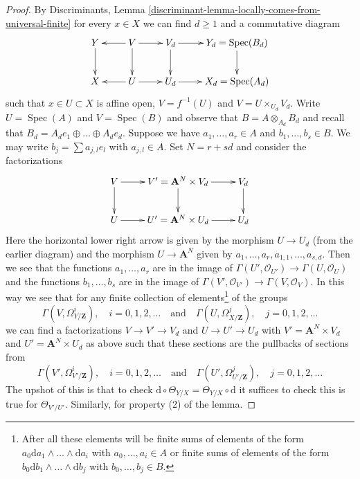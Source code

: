 \documentclass[10pt,a4paper]{amsart}
\theoremstyle{plain}
\theoremstyle{definition}
\theoremstyle{remark}
\numberwithin{equation}{subsection}
\def\Spec{\mathop{\mathrm{Spec}}}
\begin{document}
\begin{proof}
By Discriminants, Lemma
\ref{discriminant-lemma-locally-comes-from-universal-finite}
for every $x \in X$ we can find $d \geq 1$ and a commutative diagram
$$
\xymatrix{
Y \ar[d] &
V \ar[d] \ar[l] \ar[r] &
V_d \ar[d] \ar[r] &
Y_d = \Spec(B_d) \ar[d] \\
X &
U \ar[l] \ar[r] &
U_d \ar[r] &
X_d = \Spec(A_d)
}
$$
such that $x \in U \subset X$ is affine open, $V = f^{-1}(U)$
and $V = U \times_{U_d} V_d$. Write $U = \Spec(A)$ and $V = \Spec(B)$
and observe that $B = A \otimes_{A_d} B_d$ and recall that
$B_d = A_d e_1 \oplus \ldots \oplus A_d e_d$. Suppose we have
$a_1, \ldots, a_r \in A$ and $b_1, \ldots, b_s \in B$.
We may write $b_j = \sum a_{j, l} e_l$ with $a_{j, l} \in A$.
Set $N = r + sd$ and consider the factorizations
$$
\xymatrix{
V \ar[r] \ar[d] &
V' = \mathbf{A}^N \times V_d \ar[r] \ar[d] &
V_d \ar[d] \\
U \ar[r]&
U' = \mathbf{A}^N \times U_d \ar[r] &
U_d
}
$$
Here the horizontal lower right arrow is given by the morphism
$U \to U_d$ (from the earlier diagram) and the morphism
$U \to \mathbf{A}^N$ given by $a_1, \ldots, a_r, a_{1, 1}, \ldots, a_{s, d}$.
Then we see that the functions $a_1, \ldots, a_r$ are in the image of
$\Gamma(U', \mathcal{O}_{U'}) \to \Gamma(U, \mathcal{O}_U)$
and the functions $b_1, \ldots, b_s$ are in the image of
$\Gamma(V', \mathcal{O}_{V'}) \to \Gamma(V, \mathcal{O}_V)$.
In this way we see that for any finite collection of elements\footnote{After
all these elements will be finite sums of elements of the form
$a_0 \text{d}a_1 \wedge \ldots \wedge \text{d}a_i$ with
$a_0, \ldots, a_i \in A$ or finite sums of elements of the form
$b_0 \text{d}b_1 \wedge \ldots \wedge \text{d}b_j$ with
$b_0, \ldots, b_j \in B$.} of the groups
$$
\Gamma(V, \Omega^i_{Y/\mathbf{Z}}),\quad i = 0, 1, 2, \ldots
\quad\text{and}\quad
\Gamma(U, \Omega^j_{X/\mathbf{Z}}),\quad j = 0, 1, 2, \ldots
$$
we can find a factorizations $V \to V' \to V_d$ and
$U \to U' \to U_d$ with $V' = \mathbf{A}^N \times V_d$ and
$U' = \mathbf{A}^N \times U_d$ as above
such that these sections are the pullbacks of sections from
$$
\Gamma(V', \Omega^i_{V'/\mathbf{Z}}),\quad i = 0, 1, 2, \ldots
\quad\text{and}\quad
\Gamma(U', \Omega^j_{U'/\mathbf{Z}}),\quad j = 0, 1, 2, \ldots
$$
The upshot of this is that to check
$\text{d} \circ \Theta_{Y/X} = \Theta_{Y/X} \circ \text{d}$
it suffices to check this is true for $\Theta_{V'/U'}$.
Similarly, for property (2) of the lemma.


\end{proof}
\end{document}
